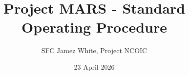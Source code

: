 \documentclass{sop}
\title{Project MARS - Standard Operating Procedure}
\author{SFC Jamez White, Project NCOIC}
\date{23 April 2026}
\begin{document}


\tableofcontents
\listoffigures
\listoftables








 

\begin{appendices}



% 

% 
\end{appendices}

\end{document}

